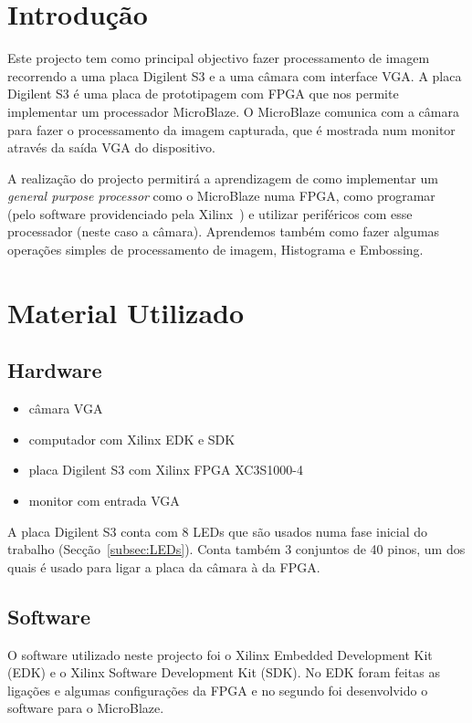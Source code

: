 \documentclass[a4paper]{article}
\begin{document}


\tableofcontents
\pagebreak

\section{Introdução}
Este projecto tem como principal objectivo fazer processamento de imagem recorrendo a uma placa Digilent S3 e a uma câmara com interface VGA. A placa Digilent S3 é uma placa de prototipagem com FPGA que nos permite implementar um processador MicroBlaze. O MicroBlaze comunica com a câmara para fazer o processamento da imagem capturada, que é mostrada num monitor através da saída VGA do dispositivo.

A realização do projecto permitirá a aprendizagem de como implementar um \textit{general purpose processor} como o MicroBlaze numa FPGA, como programar (pelo software providenciado pela Xilinx\textregistered\ ) e utilizar periféricos com esse processador (neste caso a câmara). Aprendemos também como fazer algumas operações simples de processamento de imagem, Histograma e Embossing.


\section{Material Utilizado}
\subsection*{Hardware}
\begin{itemize}
\item câmara VGA
\item computador com Xilinx EDK e SDK
\item placa Digilent S3 com Xilinx FPGA XC3S1000-4
\item monitor com entrada VGA
\end{itemize}

A placa Digilent S3 conta com 8 LEDs que são usados numa fase inicial do trabalho (Secção~\ref{subsec:LEDs}). Conta também 3 conjuntos de 40 pinos, um dos quais é usado para ligar a placa da câmara à da FPGA.

\subsection*{Software}
O software utilizado neste projecto foi o Xilinx Embedded Development Kit (EDK) e o Xilinx Software Development Kit (SDK). No EDK foram feitas as ligações e algumas configurações da FPGA e no segundo foi desenvolvido o software para o MicroBlaze.
\end{document}
